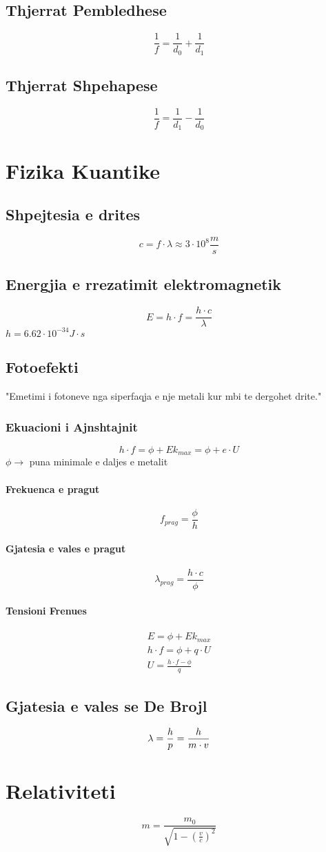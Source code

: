 \documentclass[a4paper, twocolumn]{article}
\begin{document}
\subsection{Thjerrat Pembledhese}
\[
\frac{1}{f}=\frac{1}{d_0}+\frac{1}{d_1}
\]
\subsection{Thjerrat Shpehapese}
\[
\frac{1}{f}=\frac{1}{d_1}-\frac{1}{d_0}
\]
\section{Fizika Kuantike}
\subsection{Shpejtesia e drites}
\[
c=f\cdot \lambda \approx 3 \cdot 10^8 \frac{m}{s}
\]
\subsection{Energjia e rrezatimit elektromagnetik}
\[
E = h\cdot f = \frac{h\cdot c}{\lambda}
\]
$h=6.62\cdot 10^{-34}J\cdot s$
\subsection{Fotoefekti}
"Emetimi i fotoneve nga siperfaqja e nje metali kur mbi te dergohet drite."
\subsubsection{Ekuacioni i Ajnshtajnit}
\[
	h\cdot f= \phi + Ek_{max} = \phi + e \cdot U
\]
$\phi \rightarrow$ puna minimale e daljes e metalit
\paragraph{Frekuenca e pragut}
\[
f_{prag} = \frac{\phi}{h}
\]
\paragraph{Gjatesia e vales e pragut}
\[
\lambda_{prag} = \frac{h \cdot c}{\phi}
\]
\paragraph{Tensioni Frenues}
\begin{gather*}
	E = \phi + Ek_{max} \\
	h \cdot f = \phi + q \cdot U \\
	U = \frac{h\cdot f - \phi}{q}
\end{gather*}
\subsection{Gjatesia e vales se De Brojl}
\[
\lambda = \frac{h}{p}=\frac{h}{m\cdot v} \\
\]
\section{Relativiteti}
\[
	m=\frac{m_0}{\sqrt{1-\left( \frac{v}{c} \right)^2 } }
\]
\end{document}

